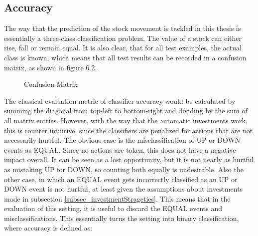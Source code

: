 \subsection{Accuracy}

The way that the prediction of the stock movement is tackled in this thesis is essentially a three-class classification problem. The value of a stock can either rise, fall or remain equal. It is also clear, that for all test examples, the actual class is known, which means that all test results can be recorded in a confusion matrix, as shown in figure 6.2.
\\
\begin{figure}[h]
\centering
\hspace*{-2cm}
\label{fig_confusionMatrix}
\caption[Confusion Matrix]{Confusion Matrix}
\end{figure}

The classical evaluation metric of classifier accuracy would be calculated by summing the diagonal from top-left to bottom-right and dividing by the sum of all matrix entries. However, with the way that the automatic investments work, this is counter intuitive, since the classifiers are penalized for actions that are not necessarily hurtful. The obvious case is the misclassification of UP or DOWN events as EQUAL. Since no actions are taken, this does not have a negative impact overall. It can be seen as a lost opportunity, but it is not nearly as hurtful as mistaking UP for DOWN, so counting both equally is undesirable. Also the other case, in which an EQUAL event gets incorrectly classified as an UP or DOWN event is not hurtful, at least given the assumptions about investments made in subsection \ref{subsec_investmentStrageties}. This means that in the evaluation of this setting, it is useful to discard the EQUAL events and misclassifications. This essentially turns the setting into binary classification, where accuracy is defined as:

